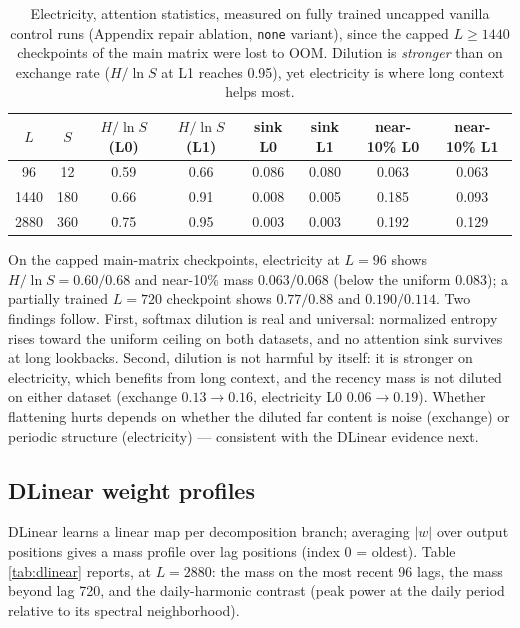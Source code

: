 \begin{table}[t]
\caption{Electricity, attention statistics, measured on fully trained uncapped vanilla control runs (Appendix repair ablation, \texttt{none} variant), since the capped $L{\ge}1440$ checkpoints of the main matrix were lost to OOM. Dilution is \emph{stronger} than on exchange rate ($H/\ln S$ at L1 reaches 0.95), yet electricity is where long context helps most.}
\label{tab:attn_electricity}
\centering\small
\begin{tabular}{cc cc cc cc}
\toprule
$L$ & $S$ & $H/\ln S$(L0) & $H/\ln S$(L1) & sink L0 & sink L1 & near-10\% L0 & near-10\% L1 \\
\midrule
96 & 12 & 0.59 & 0.66 & 0.086 & 0.080 & 0.063 & 0.063 \\
1440 & 180 & 0.66 & 0.91 & 0.008 & 0.005 & 0.185 & 0.093 \\
2880 & 360 & 0.75 & 0.95 & 0.003 & 0.003 & 0.192 & 0.129 \\
\bottomrule
\end{tabular}
\end{table}

On the capped main-matrix checkpoints, electricity at $L{=}96$ shows $H/\ln S = 0.60/0.68$ and near-10\% mass $0.063/0.068$ (below the uniform $0.083$); a partially trained $L{=}720$ checkpoint shows $0.77/0.88$ and $0.190/0.114$. Two findings follow. First, softmax dilution is real and universal: normalized entropy rises toward the uniform ceiling on both datasets, and no attention sink survives at long lookbacks. Second, dilution is not harmful by itself: it is stronger on electricity, which benefits from long context, and the recency mass is not diluted on either dataset (exchange $0.13 \to 0.16$, electricity L0 $0.06 \to 0.19$). Whether flattening hurts depends on whether the diluted far content is noise (exchange) or periodic structure (electricity) --- consistent with the DLinear evidence next.

\subsection{DLinear weight profiles}

DLinear learns a linear map per decomposition branch; averaging $|w|$ over output positions gives a mass profile over lag positions (index $0$ = oldest). Table \ref{tab:dlinear} reports, at $L{=}2880$: the mass on the most recent 96 lags, the mass beyond lag 720, and the daily-harmonic contrast (peak power at the daily period relative to its spectral neighborhood).

